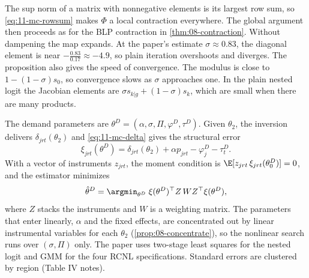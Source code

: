 The sup norm of a matrix with nonnegative elements is its largest row sum, so \eqref{eq:11-mc-rowsum} makes $\Phi$ a
local contraction everywhere. The global argument then proceeds as for the BLP contraction in \cref{thm:08-contraction}.
Without dampening the map expands. At the paper's estimate $\sigma \approx 0.83$, the diagonal element is near
$-\frac{0.83}{0.17} \approx -4.9$, so plain iteration overshoots and diverges. The proposition also gives the speed of
convergence. The modulus is close to $1 - (1-\sigma)s_0$, so convergence slows as $\sigma$ approaches one. In the
plain nested logit the Jacobian elements are $\sigma s_{k|g} + (1-\sigma)s_k$, which are small when there are many
products.

The demand parameters are $\theta^D = (\alpha, \sigma, \Pi, \varphi^D, \tau^D)$. Given $\theta_2$, the inversion
delivers $\delta_{jrt}(\theta_2)$ and \eqref{eq:11-mc-delta} gives the structural error
\begin{equation}\label{eq:11-mc-xi}
  \xi_{jrt}(\theta^D) = \delta_{jrt}(\theta_2) + \alpha p_{jrt} - \varphi^D_j - \tau^D_t .
\end{equation}
With a vector of instruments $z_{jrt}$, the moment condition is $\E[z_{jrt}\,\xi_{jrt}(\theta^D_0)] = 0$, and the
estimator minimizes
\begin{equation}\label{eq:11-mc-gmm}
  \hat\theta^D = \argmin_{\theta^D}\; \xi(\theta^D)^\top Z\, W Z^\top \xi(\theta^D),
\end{equation}
where $Z$ stacks the instruments and $W$ is a weighting matrix. The parameters that enter linearly, $\alpha$ and the
fixed effects, are concentrated out by linear instrumental variables for each $\theta_2$ (\cref{prop:08-concentrate}),
so the nonlinear search runs over $(\sigma, \Pi)$ only. The paper uses two-stage least squares for the nested logit
and GMM for the four RCNL specifications. Standard errors are clustered by region (Table IV notes).

